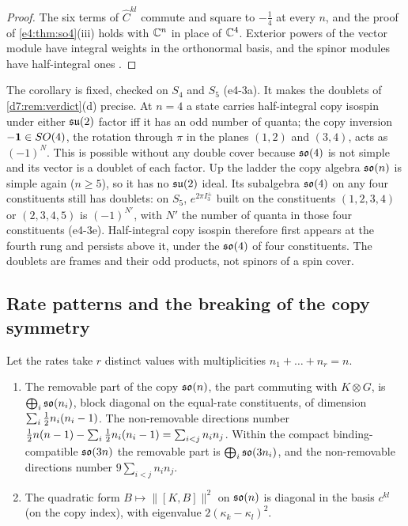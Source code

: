 \begin{proof}
The six terms of $\hat C^{kl}$ commute and square to $-\tfrac14$ at every $n$, and the proof of \cref{e4:thm:so4}(iii) holds with $\mathbb{C}^n$ in place of $\mathbb{C}^4$.
Exterior powers of the vector module have integral weights in the orthonormal basis, and the spinor modules have half-integral ones
\cite{LawsonMichelsohn89}.
\end{proof}

The corollary is fixed, checked on $S_4$ and $S_5$ (e4-3a). It makes the doublets of \cref{d7:rem:verdict}(d) precise. At $n=4$ a state carries
half-integral copy isospin under either $\mathfrak{su}(2)$ factor iff it has an odd number of quanta; the copy inversion $-\mathbf 1\in SO(4)$, the rotation through $\pi$
in the planes $(1,2)$ and $(3,4)$, acts as $(-1)^N$. This is possible without any double cover because $\mathfrak{so}(4)$ is not simple and its vector is a
doublet of each factor. Up the ladder the copy algebra $\mathfrak{so}(n)$ is simple again ($n\ge5$), so it has no $\mathfrak{su}(2)$ ideal. Its subalgebra $\mathfrak{so}(4)$ on any four
constituents still has doublets: on $S_5$, $e^{2\pi I^\pm_3}$ built on the constituents $(1,2,3,4)$ or $(2,3,4,5)$ is $(-1)^{N'}$, with $N'$ the number of
quanta in those four constituents (e4-3e). Half-integral copy isospin therefore first appears at the fourth rung and persists above it, under
the $\mathfrak{so}(4)$ of four constituents. The doublets are frames and their odd products, not spinors of a spin cover.

\subsection{Rate patterns and the breaking of the copy symmetry}
\label{e4:sec:rates}

\begin{proposition}
\label{e4:prop:rates}
Let the rates take $r$ distinct values with multiplicities $n_1+\dots+n_r=n$.
\begin{enumerate}[label=(\roman*),leftmargin=2.2em]
\item The removable part of the copy $\mathfrak{so}(n)$, the part commuting with $K\otimes G$, is $\bigoplus_i\mathfrak{so}(n_i)$, block diagonal on the equal-rate
constituents, of dimension $\sum_i\tfrac12 n_i(n_i-1)$. The non-removable directions number $\tfrac12 n(n-1)-\sum_i\tfrac12 n_i(n_i-1)=\sum_{i<j}n_in_j$. Within the
compact binding-compatible $\mathfrak{so}(3n)$ the removable part is $\bigoplus_i\mathfrak{so}(3n_i)$, and the non-removable directions number $9\sum_{i<j}n_in_j$.
\item The quadratic form $B\mapsto\|[K,B]\|^2$ on $\mathfrak{so}(n)$ is diagonal in the basis $c^{kl}$ (on the copy index), with eigenvalue $2(\kappa_k-\kappa_l)^2$.
\end{enumerate}
\end{proposition}

